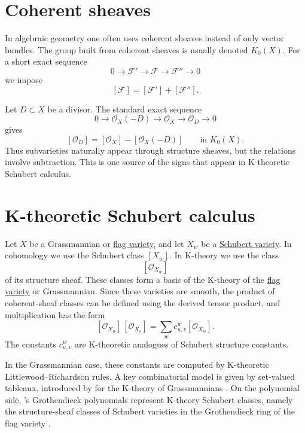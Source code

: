 \section[kTheoryCoherentSheaves]{Coherent sheaves}

In algebraic geometry one often uses coherent sheaves instead of only vector
bundles.  The group built from coherent sheaves is usually denoted $K_0(X)$.
For a short exact sequence
\[
  0\longrightarrow \mathcal F'\longrightarrow \mathcal F
  \longrightarrow \mathcal F''\longrightarrow 0
\]
we impose
\[
  [\mathcal F]=[\mathcal F']+[\mathcal F''].
\]

\begin{example*}[A divisor]
Let $D\subset X$ be a divisor.  The standard exact sequence
\[
  0\longrightarrow \mathcal O_X(-D)\longrightarrow \mathcal O_X
  \longrightarrow \mathcal O_D\longrightarrow 0
\]
gives
\[
  [\mathcal O_D]=[\mathcal O_X]-[\mathcal O_X(-D)]
  \qquad\text{in } K_0(X).
\]
Thus subvarieties naturally appear through structure sheaves, but the
relations involve subtraction.  This is one source of the signs that appear in
K-theoretic Schubert calculus.
\end{example*}


\section[kTheoreticSchubertCalculus]{K-theoretic Schubert calculus}

Let $X$ be a Grassmannian or \hyperref[flagVarietyDefinition]{flag variety},
and let $X_w$ be a \hyperref[schubertVarietyDefinition]{Schubert variety}.
In cohomology we use the Schubert class $[X_w]$.  In K-theory we use
the class
\[
  [\mathcal O_{X_w}]
\]
of its structure sheaf.  These classes form a basis of the K-theory of the
\hyperref[flagVarietyDefinition]{flag variety} or Grassmannian.  Since these varieties are smooth, the product
of coherent-sheaf classes can be defined using the derived tensor product,
and multiplication has the form
\[
  [\mathcal O_{X_u}]\,[\mathcal O_{X_v}]
  =
  \sum_w c_{u,v}^w[\mathcal O_{X_w}].
\]
The constants $c_{u,v}^w$ are K-theoretic analogues of Schubert structure
constants.

In the Grassmannian case, these constants are computed by
K-theoretic Littlewood--Richardson rules.  A key combinatorial model is given
by set-valued tableaux, introduced by  for the K-theory
of Grassmannians \cite{Buch2002}.  On the polynomial side, 's Grothendieck polynomials represent K-theory Schubert classes,
namely the structure-sheaf classes of Schubert varieties in the Grothendieck
ring of the flag variety \cite{Lascoux1990Grothendieck}.


